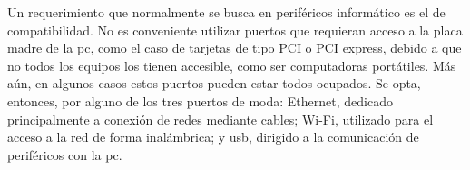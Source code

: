 



Un requerimiento que normalmente se busca en periféricos informático es el de compatibilidad. No es conveniente utilizar puertos que requieran acceso a la placa madre de la \acrshort{pc}, como el caso de tarjetas de tipo PCI o PCI express, debido a que no todos los equipos los tienen accesible, como ser computadoras portátiles. Más aún, en algunos casos estos puertos pueden estar todos ocupados. Se opta, entonces, por alguno de los tres puertos de moda: Ethernet, dedicado principalmente a conexión de redes mediante cables; Wi-Fi, utilizado para el acceso a la red de forma inalámbrica; y \acrshort{usb}, dirigido a la comunicación de periféricos con la \acrshort{pc}.%


